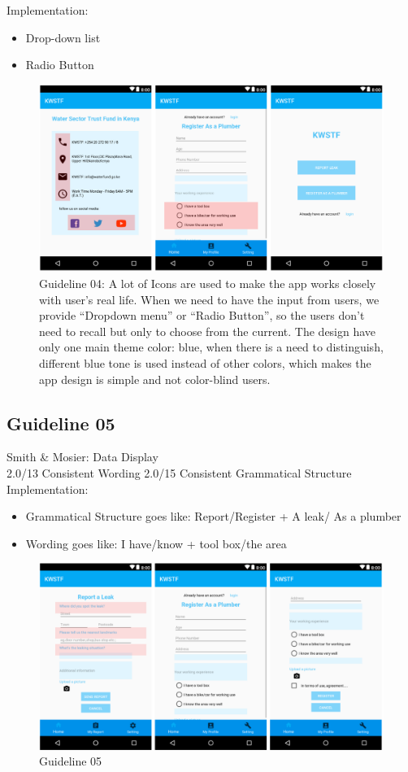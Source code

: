 \documentclass{article}
\begin{document}
\noindent
Implementation:
\begin{itemize}
\item Drop-down list
\item Radio Button
\end{itemize}

\begin{figure}[H]
\centering
\includegraphics[width=15cm]{files/figures/fig1_guide4.png}
\caption{Guideline 04: A lot of Icons are used to make the app works closely with user’s real life. When we need to have the input from users, we
provide “Dropdown menu” or “Radio Button”, so the users don’t need to recall but only to choose from the current. The
design have only one main theme color: blue, when there is a need to distinguish, different blue tone is used instead of
other colors, which makes the app design is simple and not color-blind users.}\nocite{*}

\end{figure} 



\subsection{Guideline 05}
Smith \& Mosier: Data Display\\
2.0/13 Consistent Wording 2.0/15 Consistent Grammatical Structure
\noindent
Implementation:
\begin{itemize}
\item Grammatical Structure goes like: Report/Register + A leak/ As a plumber
\item Wording goes like: I have/know + tool box/the area
\end{itemize}

\begin{figure}[H]
\centering
\includegraphics[width=15cm]{files/figures/fig1_guide5.png}
\caption{Guideline 05}

\end{figure} 



\newpage


 
\end{document}
